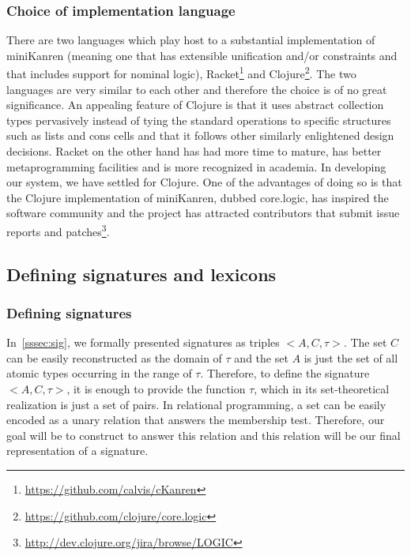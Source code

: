\subsubsection{Choice of implementation language}

There are two languages which play host to a substantial implementation
of miniKanren (meaning one that has extensible unification and/or
constraints and that includes support for nominal logic),
Racket\footnote{\url{https://github.com/calvis/cKanren}} and
Clojure\footnote{\url{https://github.com/clojure/core.logic}}. The two
languages are very similar to each other and therefore the choice is of
no great significance. An appealing feature of Clojure is that it uses
abstract collection types pervasively instead of tying the standard
operations to specific structures such as lists and cons cells and that
it follows other similarly enlightened design decisions. Racket on the
other hand has had more time to mature, has better metaprogramming
facilities and is more recognized in academia. In developing our system,
we have settled for Clojure. One of the advantages of doing so is that
the Clojure implementation of miniKanren, dubbed core.logic, has
inspired the software community and the project has attracted
contributors that submit issue reports and
patches\footnote{\url{http://dev.clojure.org/jira/browse/LOGIC}}.


\subsection{Defining signatures and lexicons}

\subsubsection{Defining signatures}

In~\ref{sssec:sig}, we formally presented signatures as triples
$\mathopen{<}A, C, \tau\mathclose{>}$. The set $C$ can be easily
reconstructed as the domain of $\tau$ and the set $A$ is just the set of
all atomic types occurring in the range of $\tau$. Therefore, to define
the signature $\mathopen{<}A, C, \tau\mathclose{>}$, it is enough to
provide the function $\tau$, which in its set-theoretical realization is
just a set of pairs. In relational programming, a set can be easily
encoded as a unary relation that answers the membership test. Therefore,
our goal will be to construct to answer this relation and this relation
will be our final representation of a signature.


